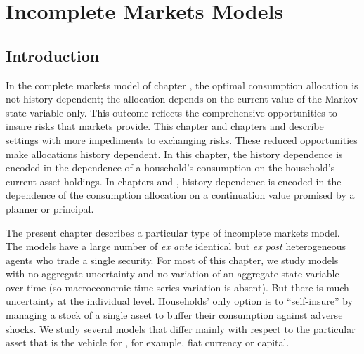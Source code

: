 
%

%

%
%


\chapter{Incomplete Markets Models\label{incomplete}}
\offparens
\section{Introduction}

 In the complete markets model of chapter ,
the optimal consumption allocation is not history dependent; the allocation
depends on the current value of the  Markov state variable only.  This
outcome reflects the comprehensive opportunities to insure risks that
markets provide.   This chapter and chapters 
and 
describe settings with more impediments to exchanging risks.  These
reduced opportunities make allocations history dependent.  In this
chapter, the history dependence is encoded in the dependence
of a household's  consumption on the household's current asset
holdings.  In chapters 
and , history dependence
is encoded in the dependence of the consumption allocation on a
continuation value promised by a planner or principal.

%
%
  The present chapter describes a particular type of incomplete
markets model.
 The models have a large number of {\it ex ante\/} identical but
{\it ex post\/} heterogeneous agents who trade a single security.
For most of this chapter, we study models with no
aggregate uncertainty and no variation of an aggregate
state variable over time (so macroeconomic time series
variation is absent).  But there is much uncertainty at
the individual level.  Households' only option
is to ``self-insure''  by managing a
stock of a single  asset to buffer their consumption against
adverse shocks.  We study several models that differ mainly
with respect to the particular asset that is the vehicle
for ,
for example, fiat currency or  capital.
%

